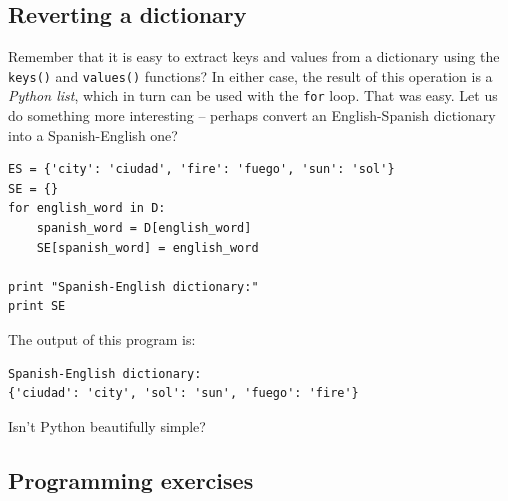 \subsection{Reverting a dictionary}

Remember that it is easy to extract keys and values from a dictionary using the 
{\tt keys()} and {\tt values()} functions? In either case, the result of this operation 
is a {\em Python list}, which in turn can be used with the {\tt for} loop. That was easy. Let us do something more interesting -- 
perhaps convert an English-Spanish dictionary into a Spanish-English one? 

\begin{verbatim}
ES = {'city': 'ciudad', 'fire': 'fuego', 'sun': 'sol'}
SE = {}
for english_word in D:
    spanish_word = D[english_word]
    SE[spanish_word] = english_word
    
print "Spanish-English dictionary:"
print SE
\end{verbatim}
The output of this program is:

\begin{verbatim}
Spanish-English dictionary:
{'ciudad': 'city', 'sol': 'sun', 'fuego': 'fire'}
\end{verbatim}
Isn't Python beautifully simple?



\subsection{Programming exercises}

